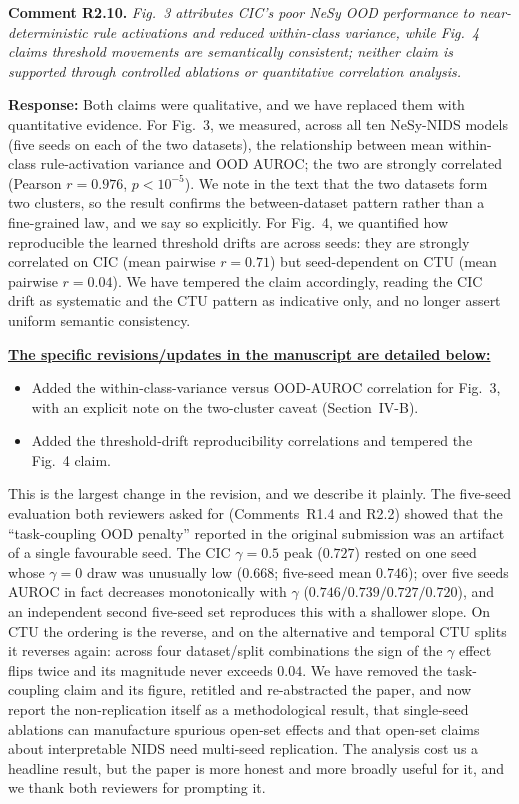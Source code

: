 \documentclass[11pt]{article}
\newcommand{\cmt}[2]{\medskip\noindent\textbf{Comment #1.} \textit{#2}\par}
\newcommand{\resp}{\smallskip\par\noindent\textbf{Response:} }
\newcommand{\revs}{\smallskip\par\noindent\underline{\textbf{The specific revisions/updates in the manuscript are detailed below:}}\par}
\begin{document}
\cmt{R2.10}{Fig.~3 attributes CIC's poor NeSy OOD performance to near-deterministic
rule activations and reduced within-class variance, while Fig.~4 claims threshold
movements are semantically consistent; neither claim is supported through
controlled ablations or quantitative correlation analysis.}
\resp Both claims were qualitative, and we have replaced them with quantitative
evidence. For Fig.~3, we measured, across all ten NeSy-NIDS models (five seeds on
each of the two datasets), the relationship between mean within-class
rule-activation variance and OOD AUROC; the two are strongly correlated (Pearson
$r{=}0.976$, $p<10^{-5}$). We note in the text that the two datasets form two
clusters, so the result confirms the between-dataset pattern rather than a
fine-grained law, and we say so explicitly. For Fig.~4, we quantified how
reproducible the learned threshold drifts are across seeds: they are strongly
correlated on CIC (mean pairwise $r{=}0.71$) but seed-dependent on CTU (mean
pairwise $r{=}0.04$). We have tempered the claim accordingly, reading the CIC drift
as systematic and the CTU pattern as indicative only, and no longer assert uniform
semantic consistency.
\revs
\begin{itemize}
  \item Added the within-class-variance versus OOD-AUROC correlation for Fig.~3,
  with an explicit note on the two-cluster caveat (Section~IV-B).
  \item Added the threshold-drift reproducibility correlations and tempered the
  Fig.~4 claim.
\end{itemize}

\bigskip
{}\par
\smallskip
\noindent This is the largest change in the revision, and we describe it plainly.
The five-seed evaluation both reviewers asked for (Comments~R1.4 and R2.2) showed
that the ``task-coupling OOD penalty'' reported in the original submission was an
artifact of a single favourable seed. The CIC $\gamma{=}0.5$ peak ($0.727$) rested
on one seed whose $\gamma{=}0$ draw was unusually low ($0.668$; five-seed mean
$0.746$); over five seeds AUROC in fact decreases monotonically with $\gamma$
($0.746/0.739/0.727/0.720$), and an independent second five-seed set reproduces
this with a shallower slope. On CTU the ordering is the reverse, and on the
alternative and temporal CTU splits it reverses again: across four dataset/split
combinations the sign of the $\gamma$ effect flips twice and its magnitude never
exceeds $0.04$. We have removed the task-coupling claim and its figure, retitled
and re-abstracted the paper, and now report the non-replication itself as a
methodological result, that single-seed ablations can manufacture spurious
open-set effects and that open-set claims about interpretable NIDS need multi-seed
replication. The analysis cost us a headline result, but the paper is more honest
and more broadly useful for it, and we thank both reviewers for prompting it.
\end{document}
